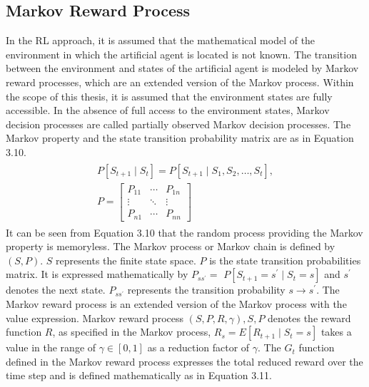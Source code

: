 \documentclass[12pt,twoside,a4]{mwbk}
\begin{document}
\subsection{Markov Reward Process}
In the RL approach, it is assumed that the mathematical model of the environment in which the artificial agent is located is not known. The transition between the environment and states of the artificial agent is modeled by Markov reward processes, which are an extended version of the Markov process. Within the scope of this thesis, it is assumed that the environment states are fully accessible. In the absence of full access to the environment states, Markov decision processes are called partially observed Markov decision processes. The Markov property and the state transition probability matrix are as in Equation 3.10.
\begin{subequations}
\begin{align}
    \begin{gathered}
    P\left[S_{t+1} \mid S_{t}\right]=P\left[S_{t+1} \mid S_{1}, S_{2}, \ldots, S_{t}\right], \\
    P=\left[\begin{array}{ccc}
    P_{11} & \cdots & P_{1 n} \\
    \vdots & \ddots & \vdots \\
    P_{n 1} & \cdots & P_{n n}
    \end{array}\right]
    \end{gathered}
\end{align}
\end{subequations}
It can be seen from Equation 3.10 that the random process providing the Markov property is memoryless. The Markov process or Markov chain is defined by $(S, P)$. $S$ represents the finite state space. $P$ is the state transition probabilities matrix. It is expressed mathematically by $P_{s s^{\prime}}=$ $P\left[S_{t+1}=s^{\prime} \mid S_{t}=s\right]$ and $s ^{\prime}$ denotes the next state. $P_{s s^{\prime}}$ represents the transition probability $s \rightarrow s^{\prime}$. The Markov reward process is an extended version of the Markov process with the value expression. Markov reward process $(S, P, R, \gamma), S, P$ denotes the reward function $R$, as specified in the Markov process, $R_{s}=E\left[R_{t+1} \mid S_ {t}=s\right]$ takes a value in the range of $\gamma \in [0,1]$ as a reduction factor of $\gamma$. The $G_{t}$ function defined in the Markov reward process expresses the total reduced reward over the time step and is defined mathematically as in Equation 3.11.
\end{document}
